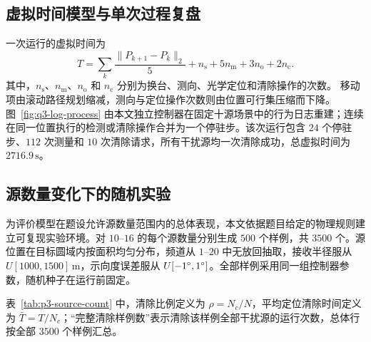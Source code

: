 \subsection{虚拟时间模型与单次过程复盘}

一次运行的虚拟时间为
\begin{equation}
T=\sum_k\frac{\|P_{k+1}-P_k\|_2}{5}
+n_{\mathrm{s}}+5n_{\mathrm{m}}
+3n_{\mathrm{o}}+2n_{\mathrm{c}}.
\label{eq:p3-time}
\end{equation}
其中，$n_{\mathrm{s}}$、$n_{\mathrm{m}}$、$n_{\mathrm{o}}$ 和
$n_{\mathrm{c}}$ 分别为换台、测向、光学定位和清除操作的次数。
移动项由滚动路径规划缩减，测向与定位操作次数则由位置可行集压缩而下降。图~\ref{fig:q3-log-process} 由本文独立控制器在固定十源场景中的行为日志重建；连续在同一位置执行的检测或清除操作合并为一个停驻步。该次运行包含 $24$ 个停驻步、$112$ 次测量和 $10$ 次清除请求，所有干扰源均一次清除成功，总虚拟时间为 $2716.9\,\mathrm s$。


\subsection{源数量变化下的随机实验}

为评价模型在题设允许源数量范围内的总体表现，本文依据题目给定的物理规则建立可复现实验环境。对 $10$--$16$ 的每个源数量分别生成 $500$ 个样例，共 $3500$ 个。源位置在目标圆域内按面积均匀分布，频道从 $1$--$20$ 中无放回抽取，接收半径服从 $U[1000,1500]\,\mathrm m$，示向度误差服从 $U[-1^{\circ},1^{\circ}]$。全部样例采用同一组控制器参数，随机种子在运行前固定。

表~\ref{tab:p3-source-count} 中，清除比例定义为 $\rho=N_c/N$，平均定位清除时间定义为 $\bar T=T/N_c$；“完整清除样例数”表示清除该样例全部干扰源的运行次数，总体行按全部 $3500$ 个样例汇总。

